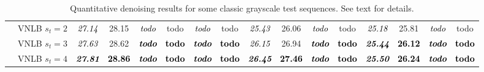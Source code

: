 \documentclass[10pt, journal, twocolumn, final, a4paper]{IEEEtran}
\newcommand{\bsic}[1]{\textcolor{black}{\textit{#1}}}
\newcommand{\Bsic}[1]{\textcolor{black}{\textbf{\textit{#1}}}}
\newcommand{\Best}[1]{\textbf{\textcolor{black}{#1}}}
\begin{document}
\begin{table}[htp!]
\begin{center}
{\begin{tabular}{ c | l |c c | c c | c c | c c | c c | c c | c c}
			                      & VNLB   $s_t = 2$     & \bsic{27.14} &       28.15  & \bsic{todo } &       todo    & \bsic{todo } &       todo    & \bsic{25.43} &       26.06  & \bsic{todo } &       todo    & \bsic{25.18} &       25.81  & \bsic{todo } &       todo   \\
			                      & VNLB   $s_t = 3$     & \bsic{27.63} &       28.62  & \Bsic{todo } & \Best{todo }  & \Bsic{todo } & \Best{todo }  & \bsic{26.15} &       26.94  & \Bsic{todo } & \Best{todo }  & \Bsic{25.44} & \Best{26.12} & \Bsic{todo } & \Best{todo } \\
			                      & VNLB   $s_t = 4$     & \Bsic{27.81} & \Best{28.86} & \Bsic{todo } & \Best{todo }  & \Bsic{todo } & \Best{todo }  & \Bsic{26.45} & \Best{27.46} & \Bsic{todo } & \Best{todo }  & \Bsic{25.50} & \Best{26.24} & \Bsic{todo } & \Best{todo } \\\hline
		\end{tabular}}
	\end{center}
	\caption{Quantitative denoising results for some classic grayscale test sequences. See text for details.}
	\label{tab:psnr-classic-gray}
\end{table}
\end{document}
